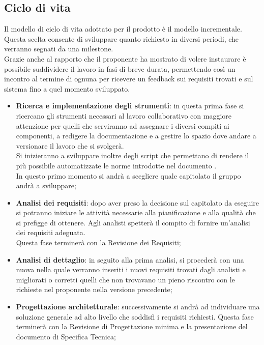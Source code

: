 	\subsection{Ciclo di vita}
	Il modello di ciclo di vita adottato per il prodotto è il modello incrementale. \\
	Questa scelta consente di sviluppare quanto richiesto in diversi periodi, che verranno segnati da una milestone. \\
	Grazie anche al rapporto che il proponente ha mostrato di volere instaurare è possibile suddividere il lavoro in fasi di breve durata, permettendo così un incontro al termine di ognuna per ricevere un feedback sui requisiti trovati e sul sistema fino a quel momento sviluppato.
		\begin{itemize}
			\item \textbf{Ricerca e implementazione degli strumenti}: in questa prima fase si ricercano gli strumenti necessari al lavoro collaborativo con maggiore attenzione per quelli che serviranno ad assegnare i diversi compiti ai componenti, a redigere la documentazione e a gestire lo spazio dove andare a versionare il lavoro che si svolgerà. \\
			Si inizieranno a sviluppare inoltre degli script che permettano di rendere il più possibile automatizzate le norme introdotte nel documento \docNameVersionNdP. \\
			In questo primo momento si andrà a scegliere quale capitolato il gruppo andrà a sviluppare;

			\item \textbf{Analisi dei requisiti}: dopo aver preso la decisione sul capitolato da eseguire si potranno iniziare le attività necessarie alla pianificazione e alla qualità che si prefigge di ottenere.
			Agli analisti spetterà il compito di fornire un'analisi dei requisiti adeguata.\\
			Questa fase terminerà con la Revisione dei Requisiti;

			\item \textbf{Analisi di dettaglio}: in seguito alla prima analisi, si procederà con una nuova nella quale verranno inseriti i nuovi requisiti trovati dagli analisti e migliorati o corretti quelli che non trovavano un pieno riscontro con le richieste nel proponente nella versione precedente;
			
			\item \textbf{Progettazione architetturale}: successivamente si andrà ad individuare una soluzione generale ad alto livello che soddisfi i requisiti richiesti. Questa fase terminerà con la Revisione di Progettazione minima e la presentazione del documento di Specifica Tecnica;


\end{itemize}
